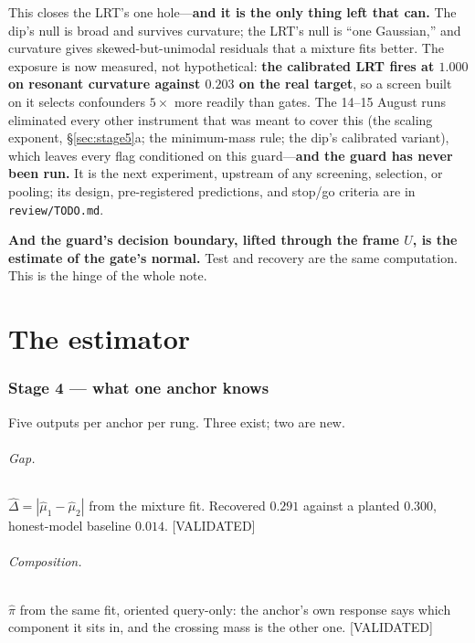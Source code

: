 \documentclass[11pt]{article}
\newcommand{\pihat}{\hat{\pi}}
\newcommand{\Dhat}{\hat{\Delta}}
\newcommand{\provtag}[2]{{\footnotesize\sffamily\textcolor{#1}{[#2]}}}
\newcommand{\VALID}{\provtag{okgreen}{VALIDATED}}
\begin{document}
This closes the LRT's one hole---\textbf{and it is the only thing left that can.} The dip's null
is broad and survives curvature; the LRT's null is ``one Gaussian,'' and curvature gives
skewed-but-unimodal residuals that a mixture fits better. The exposure is now measured, not
hypothetical: \textbf{the calibrated LRT fires at $1.000$ on resonant curvature against $0.203$
on the real target}, so a screen built on it selects confounders $5\times$ more readily than
gates. The 14--15 August runs eliminated every other instrument that was meant to cover this
(the scaling exponent, \S\ref{sec:stage5}a; the minimum-mass rule; the dip's calibrated
variant), which leaves every flag conditioned on this guard---\textbf{and the guard has never
been run.} It is the next experiment, upstream of any screening, selection, or pooling; its
design, pre-registered predictions, and stop/go criteria are in \texttt{review/TODO.md}.

\begin{claimbox}
\noindent\textbf{And the guard's decision boundary, lifted through the frame $U$, is the estimate
of the gate's normal.} Test and recovery are the same computation. This is the hinge of the whole
note.
\end{claimbox}

\part{The estimator}

\section{Stage 4 --- what one anchor knows}
\label{sec:stage4}

Five outputs per anchor per rung. Three exist; two are new.

\paragraph{Gap.} $\Dhat = |\hat\mu_1 - \hat\mu_2|$ from the mixture fit. Recovered $0.291$
against a planted $0.300$, honest-model baseline $0.014$. \VALID

\paragraph{Composition.} $\pihat$ from the same fit, oriented query-only: the anchor's own
response says which component it sits in, and the crossing mass is the other one. \VALID
\end{document}
